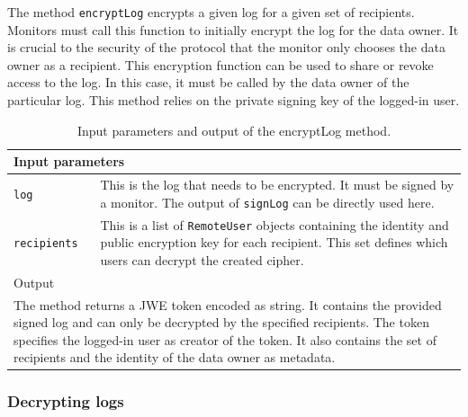 \documentclass[../main.tex]{subfiles}
\begin{document}
The method \verb|encryptLog| encrypts a given log for a given set of recipients.
Monitors must call this function to initially encrypt the log for the data owner.
It is crucial to the security of the protocol that the monitor only chooses the data owner as a recipient. 
This encryption function can be used to share or revoke access to the log.
In this case, it must be called by the data owner of the particular log. 
This method relies on the private signing key of the logged-in user.
\begin{table}[ht]
    \centering
    \begin{tabular}{|p{3cm}p{10cm}|}
        \hline
        \multicolumn{2}{|l|}{Input parameters}    \\ \hline
        \verb|log|              & This is the log that needs to be encrypted. It must be signed by a monitor. The output of \verb|signLog| can be directly used here.           \\
        \verb|recipients|       & This is a list of \verb|RemoteUser| objects containing the identity and public encryption key for each recipient. This set defines which users can decrypt the created cipher.           \\ \hline
        \multicolumn{2}{|l|}{Output}   \\ \hline
        \multicolumn{2}{|p{13cm}|}{The method returns a JWE token encoded as string. It contains the provided signed log and can only be decrypted by the specified recipients. The token specifies the logged-in user as creator of the token. It also contains the set of recipients and the identity of the data owner as metadata.} \\ \hline
    \end{tabular}
    \caption[Signature of encryptLog]{Input parameters and output of the encryptLog method.}
\end{table}

\subsubsection{Decrypting logs}
\end{document}
